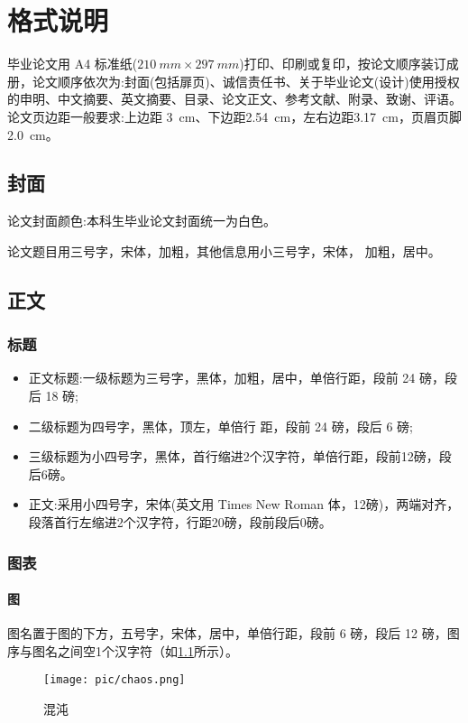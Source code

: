 \documentclass[oneside]{LZU}
\begin{document}
\chapter{格式说明}
\label{chp:format}
毕业论文用 A4 标准纸($\SI{210}{mm}\times \SI{297}{mm}$)打印、印刷或复印，按论文顺序装订成册，论文顺序依次为:封面(包括扉页)、诚信责任书、关于毕业论文(设计)使用授权的申明、中文摘要、英文摘要、目录、论文正文、参考文献、附录、致谢、评语。论文页边距一般要求:上边距 \SI{3}{cm}、下边距\SI{2.54}{cm}，左右边距\SI{3.17}{cm}，页眉页脚\SI{2.0}{cm}。
\section{封面}
论文封面颜色:本科生毕业论文封面统一为白色。

论文题目用三号字，宋体，加粗，其他信息用小三号字，宋体， 加粗，居中。
\section{正文}
\subsection{标题}
\begin{itemize}
    \item 正文标题:一级标题为三号字，黑体，加粗，居中，单倍行距，段前 24 磅，段后 18 磅;
    \item 二级标题为四号字，黑体，顶左，单倍行 距，段前 24 磅，段后 6 磅;
    \item 三级标题为小四号字，黑体，首行缩进2个汉字符，单倍行距，段前12磅，段后6磅。
    \item 正文:采用小四号字，宋体(英文用 Times New Roman 体，12磅)，两端对齐，段落首行左缩进2个汉字符，行距20磅，段前段后0磅。
\end{itemize}

\subsection{图表}
\subsubsection{图}
\label{ssub:figure}
图名置于图的下方，五号字，宋体，居中，单倍行距，段前 6 磅，段后 12 磅，图序与图名之间空1个汉字符（如\cref{fig:chaos}所示）。
\begin{figure}
    \centering
    \texttt{[image: pic/chaos.png]}
    \caption{混沌}
    \label{fig:chaos}
\end{figure}
\end{document}
